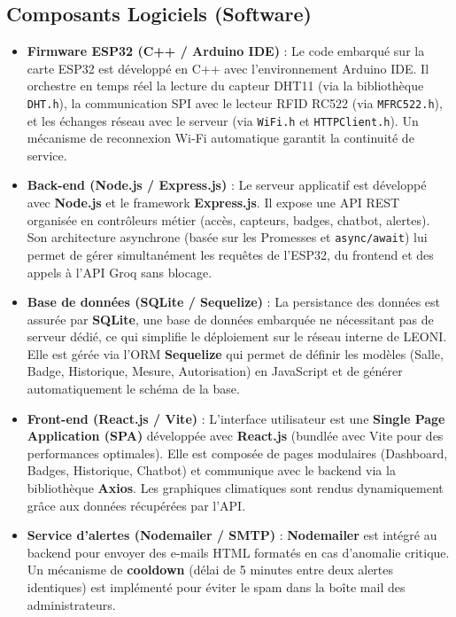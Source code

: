 \documentclass[12pt,a4paper]{report}
\begin{document}
\subsection{Composants Logiciels (Software)}
\begin{itemize}
    \item \textbf{Firmware ESP32 (C++ / Arduino IDE)} : Le code embarqué sur la carte ESP32 est développé en C++ avec l'environnement Arduino IDE. Il orchestre en temps réel la lecture du capteur DHT11 (via la bibliothèque \texttt{DHT.h}), la communication SPI avec le lecteur RFID RC522 (via \texttt{MFRC522.h}), et les échanges réseau avec le serveur (via \texttt{WiFi.h} et \texttt{HTTPClient.h}). Un mécanisme de reconnexion Wi-Fi automatique garantit la continuité de service.

    \item \textbf{Back-end (Node.js / Express.js)} : Le serveur applicatif est développé avec \textbf{Node.js} et le framework \textbf{Express.js}. Il expose une API REST organisée en contrôleurs métier (accès, capteurs, badges, chatbot, alertes). Son architecture asynchrone (basée sur les Promesses et \texttt{async/await}) lui permet de gérer simultanément les requêtes de l'ESP32, du frontend et des appels à l'API Groq sans blocage.

    \item \textbf{Base de données (SQLite / Sequelize)} : La persistance des données est assurée par \textbf{SQLite}, une base de données embarquée ne nécessitant pas de serveur dédié, ce qui simplifie le déploiement sur le réseau interne de LEONI. Elle est gérée via l'ORM \textbf{Sequelize} qui permet de définir les modèles (Salle, Badge, Historique, Mesure, Autorisation) en JavaScript et de générer automatiquement le schéma de la base.

    \item \textbf{Front-end (React.js / Vite)} : L'interface utilisateur est une \textbf{Single Page Application (SPA)} développée avec \textbf{React.js} (bundlée avec Vite pour des performances optimales). Elle est composée de pages modulaires (Dashboard, Badges, Historique, Chatbot) et communique avec le backend via la bibliothèque \textbf{Axios}. Les graphiques climatiques sont rendus dynamiquement grâce aux données récupérées par l'API.

    \item \textbf{Service d'alertes (Nodemailer / SMTP)} : \textbf{Nodemailer} est intégré au backend pour envoyer des e-mails HTML formatés en cas d'anomalie critique. Un mécanisme de \textbf{cooldown} (délai de 5 minutes entre deux alertes identiques) est implémenté pour éviter le spam dans la boîte mail des administrateurs.


\end{itemize}
\end{document}
